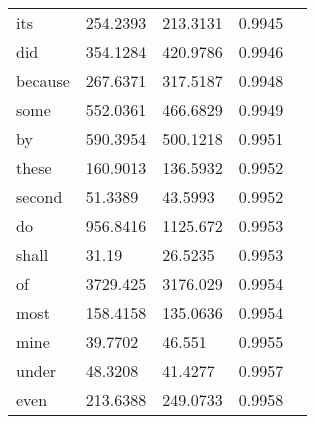 \begin{table}[H]
\begin{tabular}{@{}lllll@{}}
		its           & 254.2393               & 213.3131                 & 0.9945           &  \\
		did           & 354.1284               & 420.9786                 & 0.9946           &  \\
		because       & 267.6371               & 317.5187                 & 0.9948           &  \\
		some          & 552.0361               & 466.6829                 & 0.9949           &  \\
		by            & 590.3954               & 500.1218                 & 0.9951           &  \\
		these         & 160.9013               & 136.5932                 & 0.9952           &  \\
		second        & 51.3389                & 43.5993                  & 0.9952           &  \\
		do            & 956.8416               & 1125.672                 & 0.9953           &  \\
		shall         & 31.19                  & 26.5235                  & 0.9953           &  \\
		of            & 3729.425               & 3176.029                 & 0.9954           &  \\
		most          & 158.4158               & 135.0636                 & 0.9954           &  \\
		mine          & 39.7702                & 46.551                   & 0.9955           &  \\
		under         & 48.3208                & 41.4277                  & 0.9957           &  \\
		even          & 213.6388               & 249.0733                 & 0.9958           &  \\ \bottomrule
	\end{tabular}
\end{table}

